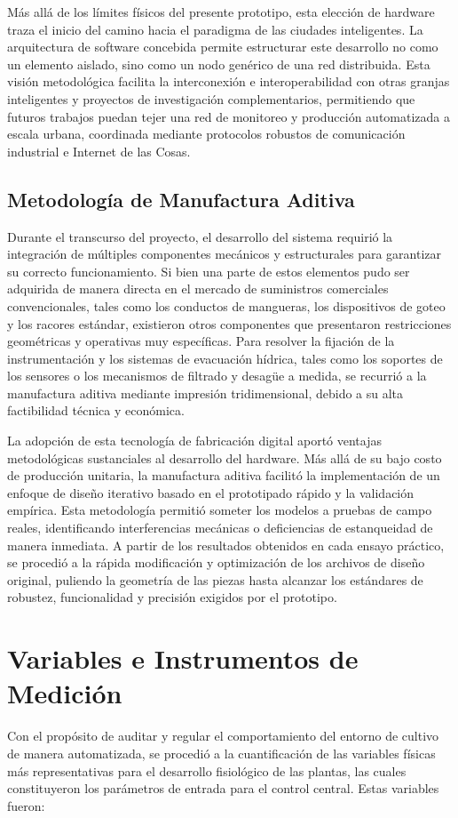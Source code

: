 Más allá de los límites físicos del presente prototipo, esta elección de hardware traza el inicio del camino hacia el paradigma de las ciudades inteligentes. La arquitectura de software concebida permite estructurar este desarrollo no como un elemento aislado, sino como un nodo genérico de una red distribuida. Esta visión metodológica facilita la interconexión e interoperabilidad con otras granjas inteligentes y proyectos de investigación complementarios, permitiendo que futuros trabajos puedan tejer una red de monitoreo y producción automatizada a escala urbana, coordinada mediante protocolos robustos de comunicación industrial e Internet de las Cosas.

\subsection{Metodología de Manufactura Aditiva}
Durante el transcurso del proyecto, el desarrollo del sistema requirió la integración de múltiples componentes mecánicos y estructurales para garantizar su correcto funcionamiento. Si bien una parte de estos elementos pudo ser adquirida de manera directa en el mercado de suministros comerciales convencionales, tales como los conductos de mangueras, los dispositivos de goteo y los racores estándar, existieron otros componentes que presentaron restricciones geométricas y operativas muy específicas. Para resolver la fijación de la instrumentación y los sistemas de evacuación hídrica, tales como los soportes de los sensores o los mecanismos de filtrado y desagüe a medida, se recurrió a la manufactura aditiva mediante impresión tridimensional, debido a su alta factibilidad técnica y económica.

La adopción de esta tecnología de fabricación digital aportó ventajas metodológicas sustanciales al desarrollo del hardware. Más allá de su bajo costo de producción unitaria, la manufactura aditiva facilitó la implementación de un enfoque de diseño iterativo basado en el prototipado rápido y la validación empírica. Esta metodología permitió someter los modelos a pruebas de campo reales, identificando interferencias mecánicas o deficiencias de estanqueidad de manera inmediata. A partir de los resultados obtenidos en cada ensayo práctico, se procedió a la rápida modificación y optimización de los archivos de diseño original, puliendo la geometría de las piezas hasta alcanzar los estándares de robustez, funcionalidad y precisión exigidos por el prototipo.

\section{Variables e Instrumentos de Medición}
Con el propósito de auditar y regular el comportamiento del entorno de cultivo de manera automatizada, se procedió a la cuantificación de las variables físicas más representativas para el desarrollo fisiológico de las plantas, las cuales constituyeron los parámetros de entrada para el control central. Estas variables fueron:


